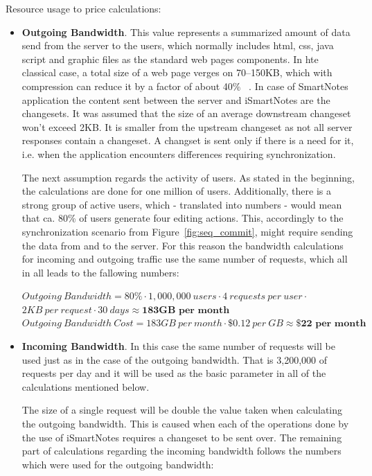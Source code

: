 Resource usage to price calculations:
\begin{itemize}
\item{\textbf{Outgoing Bandwidth}. This value represents a summarized amount of data send from the server to the users, which normally includes html, css, java script and graphic files as the standard web pages components. In hte classical case, a total size of a web page verges on \mbox{70--150KB}, which with compression can reduce it by a factor of about 40\%~\cite[page 31]{high_perf_web} . In case of SmartNotes application the content sent between the server and iSmartNotes are the changesets. It was assumed that the size of an average downstream changeset won't exceed 2KB. It is smaller from the upstream changeset as not all server responses contain a changeset. A changset is sent only if there is a need for it, i.e. when the application encounters differences requiring synchronization.  
 
The next assumption regards the activity of users. As stated in the beginning, the calculations are done for one million of users. Additionally, there is a strong group of active users, which - translated into numbers - would mean that ca. 80\% of users generate four editing actions. This, accordingly to the synchronization scenario from Figure~\ref{fig:seq_commit}, might require sending the data from and to the server.  For this reason the bandwidth calculations for incoming and outgoing traffic use the same number of requests, which all in all leads to the fallowing numbers:
 
$Outgoing\ Bandwidth =  80\% \cdot 1,000,000\ users \cdot 4\ requests\ per\ user \cdot$\\ \hspace*{37mm} $2KB\ per\ request \cdot 30\ days \approx \textbf{183GB\ per\ month}$ \\
$Outgoing\ Bandwidth\ Cost = 183GB\ per\ month \cdot \$0.12\ per\ GB \approx \textbf{\$22 per\ month}$ }
 
\item{\textbf{Incoming Bandwidth}. In this case the same number of requests will be used just as in the case of the outgoing bandwidth. That is 3,200,000 of requests per day and it will be used as the basic parameter in all of the calculations mentioned below.
 
The size of a single request will be double the value taken when calculating the outgoing bandwidth. This is caused when each of the operations done by the use of iSmartNotes requires a changeset to be sent over. The remaining part of calculations regarding the incoming bandwidth follows the numbers which were used for the outgoing bandwidth:
 
}
\end{itemize}
